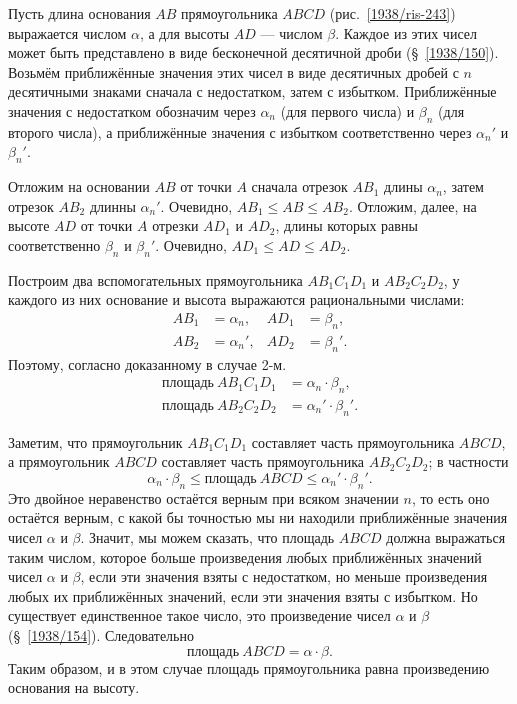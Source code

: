 \documentclass[oneside]{book}
\begin{document}
Пусть длина основания $AB$ прямоугольника $ABCD$ (рис.~\ref{1938/ris-243}) выражается  числом $\alpha$, а для высоты $AD$ — числом $\beta$.
Каждое из этих чисел может быть представлено в виде бесконечной десятичной дроби (§~\ref{1938/150}).
Возьмём приближённые значения этих чисел в виде десятичных дробей с $n$ десятичными знаками сначала с недостатком, затем с избытком.
Приближённые значения с недостатком обозначим через $\alpha_n$ (для первого числа) и $\beta_n$ (для второго числа), а приближённые значения с избытком соответственно через  $\alpha_n'$ и $\beta_n'$.

Отложим на основании $AB$ от точки $A$ сначала отрезок $AB_1$ длины $\alpha_n$, затем отрезок $AB_2$ длинны  $\alpha_n'$.
Очевидно, $AB_1\le AB\le AB_2$.
Отложим, далее, на высоте $AD$ от точки $A$ отрезки $AD_1$ и $AD_2$, длины которых равны соответственно $\beta_n$ и $\beta_n'$.
Очевидно, $AD_1\le AD\le AD_2$.

{\sloppy

Построим два вспомогательных прямоугольника $AB_1C_1D_1$ и $AB_2C_2D_2$, у каждого из них основание и высота выражаются рациональными числами:
\begin{align*}
AB_1&=\alpha_n,
&
AD_1&=\beta_n,
\\
AB_2&=\alpha_n',
&
AD_2&=\beta_n'.
\end{align*}
Поэтому, согласно доказанному в случае 2-м.
\begin{align*}
\text{площадь}~AB_1C_1D_1 &= \alpha_n\cdot \beta_n, 
\\
\text{площадь}~AB_2C_2D_2 &= \alpha_n'\cdot \beta_n'. 
\end{align*}

}

Заметим, что прямоугольник $AB_1C_1D_1$ составляет часть прямоугольника $ABCD$, 
а прямоугольник $ABCD$ составляет часть прямоугольника $AB_2C_2D_2$;
в частности
\[\alpha_n\cdot \beta_n\le\text{площадь}~ABCD\le\alpha_n'\cdot \beta_n'.\]
Это двойное неравенство остаётся верным при всяком значении $n$, то есть оно остаётся верным, с какой бы точностью мы ни находили приближённые значения чисел $\alpha$ и $\beta$.
Значит, мы можем сказать, что площадь $ABCD$ должна выражаться таким числом, которое больше произведения любых приближённых значений чисел $\alpha$ и $\beta$, если эти значения взяты с недостатком, но меньше произведения любых их приближённых значений, если эти значения взяты с избытком.
Но существует единственное такое число, это произведение чисел $\alpha$ и $\beta$ (§~\ref{1938/154}).
Следовательно 
\[\text{площадь}~ABCD=\alpha\cdot \beta.\]
Таким образом, и в этом случае площадь прямоугольника равна произведению основания на высоту.
\end{document}
